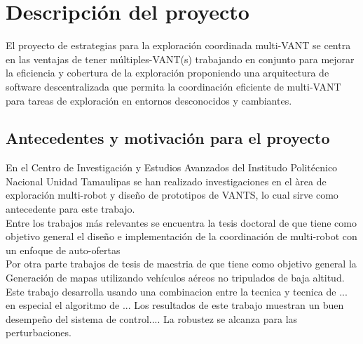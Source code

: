 \documentclass[11pt,epsf,times]{article}
\begin{document}
\newpage
\section*{Descripci\'{o}n del proyecto}

El proyecto de estrategias para la exploraci\'{o}n coordinada multi-VANT se centra en las ventajas de tener m\'{u}ltiples-VANT(s) trabajando en conjunto para mejorar la eficiencia y cobertura de la exploraci\'{o}n proponiendo una arquitectura de software descentralizada que permita la coordinaci\'{o}n eficiente de multi-VANT para tareas de exploraci\'{o}n en entornos desconocidos y cambiantes.


\subsection*{Antecedentes y motivaci\'{o}n para el proyecto}


En el Centro de Investigaci\'{o}n y Estudios Avanzados del Institudo Polit\'{e}cnico Nacional Unidad Tamaulipas se han realizado investigaciones en el \`{a}rea de exploraci\'{o}n multi-robot y dise\~{n}o de prototipos de VANTS, lo cual sirve como antecedente para este trabajo.\\

Entre los trabajos m\'{a}s relevantes se encuentra la tesis doctoral de \cite{CINVESTAM2013} que tiene como objetivo general el dise\~{n}o e implementaci\'{o}n de la coordinaci\'{o}n de multi-robot con un enfoque de auto-ofertas\\

Por otra parte trabajos de tesis de maestria de \cite{CINVES2013} que tiene como objetivo general la Generaci\'{o}n de mapas utilizando veh\'{i}culos a\'{e}reos no tripulados de baja altitud.\\

Este trabajo desarrolla usando una combinacion entre la tecnica y tecnica de ... en especial el algoritmo de ... Los resultados de este trabajo muestran un buen desempe\~{n}o del sistema de control....
La robustez se alcanza para las perturbaciones.\\
\end{document}
